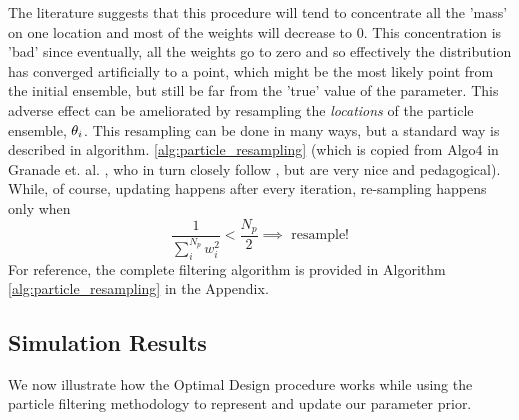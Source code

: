 \documentclass{article}
\begin{document}
The literature suggests that this procedure will tend to concentrate all the
'mass' on one location and most of the weights will decrease to 0. This
concentration is 'bad' since eventually, all the weights go to zero and so
effectively the distribution has converged  artificially to a point, which might
be the most likely point from the initial ensemble, but still be far from the
'true' value of the parameter. This adverse effect can be ameliorated by
resampling the {\sl locations} of the particle ensemble, ${\theta}_i$. This
resampling can be done in many ways, but a standard way is described in
algorithm. \ref{alg:particle_resampling} (which is copied from Algo4 in Granade
et. al. \cite{Granade2012}, who in turn closely follow \cite{Liu2001}, but
are very nice and pedagogical).
While, of course, updating happens after every iteration, re-sampling happens
only when  
$$ \frac{1}{\sum_i^{N_p} w_i^2} < \frac {N_p}{2} \implies \textrm{ resample!}$$
For reference, the complete filtering algorithm is provided in 
Algorithm \ref{alg:particle_resampling} in the Appendix.



% 


\subsection{Simulation Results}
We now illustrate how the Optimal Design procedure works while using the
particle filtering methodology to represent and update our parameter prior.
\end{document}
